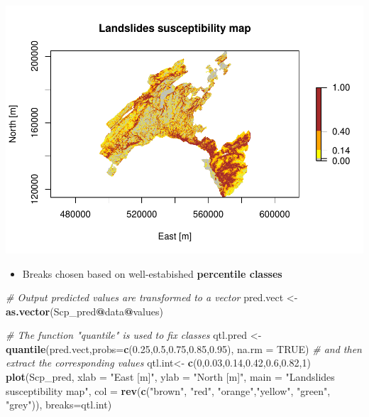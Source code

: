 \documentclass[
]{book}
\newenvironment{Shaded}{\begin{snugshade}}{\end{snugshade}}
\newcommand{\AttributeTok}[1]{\textcolor[rgb]{0.13,0.29,0.53}{#1}}
\newcommand{\CommentTok}[1]{\textcolor[rgb]{0.56,0.35,0.01}{\textit{#1}}}
\newcommand{\ConstantTok}[1]{\textcolor[rgb]{0.56,0.35,0.01}{#1}}
\newcommand{\DecValTok}[1]{\textcolor[rgb]{0.00,0.00,0.81}{#1}}
\newcommand{\FloatTok}[1]{\textcolor[rgb]{0.00,0.00,0.81}{#1}}
\newcommand{\FunctionTok}[1]{\textcolor[rgb]{0.13,0.29,0.53}{\textbf{#1}}}
\newcommand{\NormalTok}[1]{#1}
\newcommand{\OtherTok}[1]{\textcolor[rgb]{0.56,0.35,0.01}{#1}}
\newcommand{\SpecialCharTok}[1]{\textcolor[rgb]{0.81,0.36,0.00}{\textbf{#1}}}
\newcommand{\StringTok}[1]{\textcolor[rgb]{0.31,0.60,0.02}{#1}}
\providecommand{\tightlist}{%
  \setlength{\itemsep}{0pt}\setlength{\parskip}{0pt}}
\begin{document}
\includegraphics{06-RF_files/figure-latex/quantile-map-1.pdf}

\begin{itemize}
\tightlist
\item
  Breaks chosen based on well-estabished \textbf{percentile classes}
\end{itemize}

\begin{Shaded}
\begin{Highlighting}[]
\CommentTok{\# Output predicted values are transformed to a vector}
\NormalTok{pred.vect }\OtherTok{\textless{}{-}} \FunctionTok{as.vector}\NormalTok{(Scp\_pred}\SpecialCharTok{@}\NormalTok{data}\SpecialCharTok{@}\NormalTok{values)}

\CommentTok{\# The function "quantile" is used to fix classes}
\NormalTok{qtl.pred }\OtherTok{\textless{}{-}} \FunctionTok{quantile}\NormalTok{(pred.vect,}\AttributeTok{probs=}\FunctionTok{c}\NormalTok{(}\FloatTok{0.25}\NormalTok{,}\FloatTok{0.5}\NormalTok{,}\FloatTok{0.75}\NormalTok{,}\FloatTok{0.85}\NormalTok{,}\FloatTok{0.95}\NormalTok{), }\AttributeTok{na.rm =} \ConstantTok{TRUE}\NormalTok{)}
\CommentTok{\# and then extract the corresponding values}
\NormalTok{qtl.int}\OtherTok{\textless{}{-}} \FunctionTok{c}\NormalTok{(}\DecValTok{0}\NormalTok{,}\FloatTok{0.03}\NormalTok{,}\FloatTok{0.14}\NormalTok{,}\FloatTok{0.42}\NormalTok{,}\FloatTok{0.6}\NormalTok{,}\FloatTok{0.82}\NormalTok{,}\DecValTok{1}\NormalTok{)}
\FunctionTok{plot}\NormalTok{(Scp\_pred, }\AttributeTok{xlab =} \StringTok{"East [m]"}\NormalTok{, }\AttributeTok{ylab =} \StringTok{"North [m]"}\NormalTok{, }
     \AttributeTok{main =} \StringTok{"Landslides susceptibility map"}\NormalTok{, }
     \AttributeTok{col =} \FunctionTok{rev}\NormalTok{(}\FunctionTok{c}\NormalTok{(}\StringTok{"brown"}\NormalTok{, }\StringTok{"red"}\NormalTok{, }\StringTok{"orange"}\NormalTok{,}\StringTok{"yellow"}\NormalTok{, }\StringTok{"green"}\NormalTok{, }\StringTok{"grey"}\NormalTok{)), }\AttributeTok{breaks=}\NormalTok{qtl.int)}
\end{Highlighting}
\end{Shaded}
\end{document}
